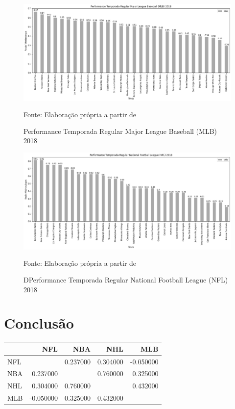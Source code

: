 \documentclass[12pt,oneside,a4paper,chapter=TITLE,english,brazil,sumario=abnt-6027-2012]{abntex2}
\begin{document}
\begin{figure}[H]
	\centering
	\caption{Performance Temporada Regular Major League Baseball (MLB) 2018}
	\includegraphics[scale=0.4]{../../output/figures/mlb.png}
	\label{dist}
	\\ \vspace{0.25cm}
	\raggedright
	\footnotesize{Fonte: Elaboração própria a partir de }
\end{figure}


\begin{figure}[H]
	\centering
	\caption{DPerformance Temporada Regular National Football League (NFL) 2018}
	\includegraphics[scale=0.4]{../../output/figures/nfl.png}
	\label{dist}
	\\ \vspace{0.25cm}
	\raggedright
	\footnotesize{Fonte: Elaboração própria a partir de }
\end{figure}

	
\chapter{Conclusão}

	\begin{table}[H]
	\centering
	\begin{tabular}{lrrrr}
	& NFL & NBA & NHL & MLB \\\hline
	NFL &  & 0.237000 & 0.304000 & -0.050000 \\\hline
	NBA & 0.237000 &  & 0.760000 & 0.325000 \\\hline
	NHL & 0.304000 & 0.760000 &  & 0.432000 \\\hline
	MLB & -0.050000 & 0.325000 & 0.432000 &  \\\hline
	\end{tabular}
	\end{table}	

	
	
	
\end{document}
